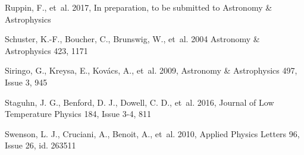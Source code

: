 \begin{thebibliography}{99}
Ruppin, F., {et~al.} 2017, 
In preparation, to be submitted to Astronomy \& Astrophysics

Schuster, K.-F., Boucher, C., Brunswig, W., {et~al.} 2004 
Astronomy \& Astrophysics 423, 1171

Siringo, G., Kreysa, E., Kov\'acs, A., {et~al.} 2009, 
Astronomy \& Astrophysics 497, Issue 3, 945

Staguhn, J. G., Benford, D. J., Dowell, C. D., {et~al.} 2016,
Journal of Low Temperature Physics 184, Issue 3-4, 811

Swenson, L. J., Cruciani, A., Benoit, A., {et~al.} 2010, 
Applied Physics Letters 96, Issue 26, id. 263511

  
  




\end{thebibliography}
